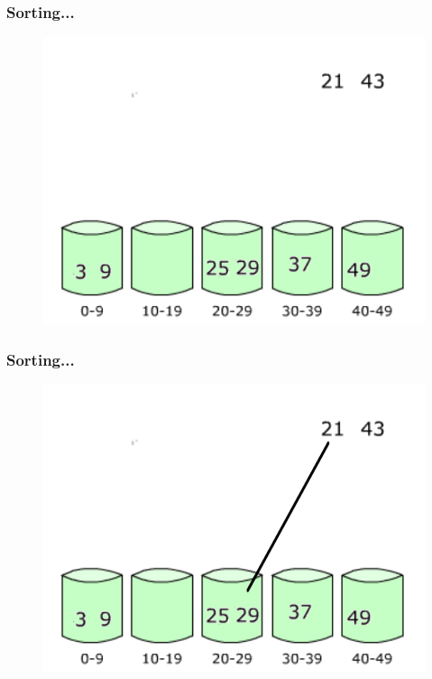 \documentclass[pdf]{beamer}
\begin{document}
\begin{frame}
	\frametitle{Sorting...}
	\begin{figure}
		\includegraphics[scale=.3]{Figure/12.png}
	\end{figure}	
\end{frame}

\begin{frame}
	\frametitle{Sorting...}
	\begin{figure}
		\includegraphics[scale=.3]{Figure/13.png}
	\end{figure}	
\end{frame}
\end{document}
